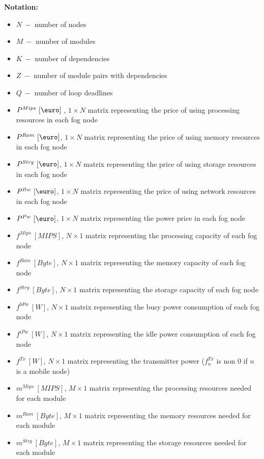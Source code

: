 \documentclass{article}
\begin{document}
\newcommand{\SubItem}[1]{
    {\setlength\itemindent{15pt} \item[-] #1}
}

\noindent\textbf{Notation:}
\begin{itemize}
	\item $N~-$ number of nodes
	\item $M~-$ number of modules
	\item $K~-$ number of dependencies
	\item $Z~-$ number of module pairs with dependencies
	\item $Q~-$ number of loop deadlines\\
	
	\item $P^{Mips}~[\mbox{\euro}]~$, $1\times N$ matrix representing the price of using processing resources in each fog node
	\item $P^{Ram}~[\mbox{\euro}]$, $1\times N$ matrix representing the price of using memory resources in each fog node
	\item $P^{Strg}~[\mbox{\euro}]$, $1\times N$ matrix representing the price of using storage resources in each fog node
	\item $P^{Bw}~[\mbox{\euro}]$, $1\times N$ matrix representing the price of using network resources in each fog node
	\item $P^{Pw}~[\mbox{\euro}]$, $1\times N$ matrix representing the power price in each fog node\\
	
	\item $f^{Mips}~[MIPS]$, $N\times 1$ matrix representing the processing capacity of each fog node
	\item $f^{Ram}~[Byte]$, $N\times 1$ matrix representing the memory capacity of each fog node
	\item $f^{Strg}~[Byte]$, $N\times 1$ matrix representing the storage capacity of each fog node
	\item $f^{bPw}~[W]$, $N\times 1$ matrix representing the busy power consumption of each fog node
	\item $f^{iPw}~[W]$, $N\times 1$ matrix representing the idle power consumption of each fog node
	\item $f^{Tx}~[W]$, $N\times 1$ matrix representing the transmitter power ($f^{Tx}_n$ is non 0 if $n$ is a mobile node)\\
	
	\item $m^{Mips}~[MIPS]$, $M\times 1$ matrix representing the processing resources needed for each module
	\item $m^{Ram}~[Byte]$, $M\times 1$ matrix representing the memory resources needed for each module
	\item $m^{Strg}~[Byte]$, $M\times 1$ matrix representing the storage resources needed for each module\\
	

\end{itemize}
\end{document}
